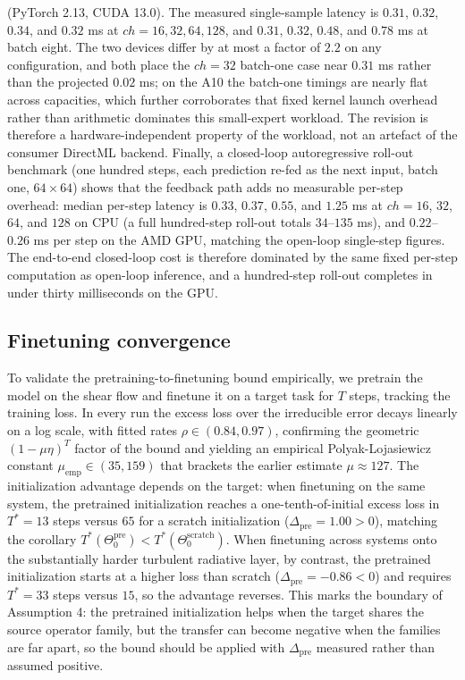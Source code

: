 \documentclass[preprint,12pt]{elsarticle}
\begin{document}
(PyTorch 2.13, CUDA 13.0). The measured single-sample latency is $0.31$, $0.32$, $0.34$, and $0.32$ ms at $ch=16,32,64,128$, and $0.31$, $0.32$, $0.48$, and $0.78$ ms at batch eight. The two devices differ by at most a factor of $2.2$ on any configuration, and both place the $ch=32$ batch-one case near $0.31$ ms rather than the projected $0.02$ ms; on the A10 the batch-one timings are nearly flat across capacities, which further corroborates that fixed kernel launch overhead rather than arithmetic dominates this small-expert workload. The revision is therefore a hardware-independent property of the workload, not an artefact of the consumer DirectML backend. Finally, a closed-loop autoregressive roll-out benchmark (one hundred steps, each prediction re-fed as the next input, batch one, $64\times64$) shows that the feedback path adds no measurable per-step overhead: median per-step latency is $0.33$, $0.37$, $0.55$, and $1.25$ ms at $ch=16$, $32$, $64$, and $128$ on CPU (a full hundred-step roll-out totals $34$--$135$ ms), and $0.22$--$0.26$ ms per step on the AMD GPU, matching the open-loop single-step figures. The end-to-end closed-loop cost is therefore dominated by the same fixed per-step computation as open-loop inference, and a hundred-step roll-out completes in under thirty milliseconds on the GPU.

\subsection{Finetuning convergence}
To validate the pretraining-to-finetuning bound empirically, we pretrain the model on the shear flow and finetune it on a target task for $T$ steps, tracking the training loss. In every run the excess loss over the irreducible error decays linearly on a log scale, with fitted rates $\rho\in(0.84,0.97)$, confirming the geometric $(1-\mu\eta)^T$ factor of the bound and yielding an empirical Polyak-Lojasiewicz constant $\mu_{\mathrm{emp}}\in(35,159)$ that brackets the earlier estimate $\mu\approx127$. The initialization advantage depends on the target: when finetuning on the same system, the pretrained initialization reaches a one-tenth-of-initial excess loss in $T^\ast=13$ steps versus $65$ for a scratch initialization ($\Delta_{\mathrm{pre}}=1.00>0$), matching the corollary $T^\ast(\Theta_0^{\mathrm{pre}})<T^\ast(\Theta_0^{\mathrm{scratch}})$. When finetuning across systems onto the substantially harder turbulent radiative layer, by contrast, the pretrained initialization starts at a higher loss than scratch ($\Delta_{\mathrm{pre}}=-0.86<0$) and requires $T^\ast=33$ steps versus $15$, so the advantage reverses. This marks the boundary of Assumption 4: the pretrained initialization helps when the target shares the source operator family, but the transfer can become negative when the families are far apart, so the bound should be applied with $\Delta_{\mathrm{pre}}$ measured rather than assumed positive.
\end{document}
